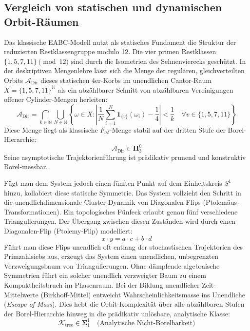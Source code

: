 \documentclass[11pt,a4paper]{article}
\numberwithin{equation}{section}
\begin{document}
	\subsection{Vergleich von statischen und dynamischen Orbit-Räumen}
	
	Das klassische EABC-Modell nutzt als statisches Fundament die Struktur der reduzierten Restklassengruppe modulo 12. Die vier primen Restklassen $\{1, 5, 7, 11\} \pmod{12}$ sind durch die Isometrien des Sehnenvierecks geschützt. In der deskriptiven Mengenlehre lässt sich die Menge der regulären, gleichverteilten Orbits $\mathcal{A}_{\text{Dir}}$ dieses statischen 4er-Korbs im unendlichen Cantor-Raum $X = \{1, 5, 7, 11\}^\mathbb{N}$ als ein abzählbarer Schnitt von abzählbaren Vereinigungen offener Cylinder-Mengen herleiten:
	\begin{equation}
		\mathcal{A}_{\text{Dir}} = \bigcap_{k \in \mathbb{N}} \bigcup_{N \in \mathbb{N}} \left\{ \omega \in X : \left| \frac{1}{N} \sum_{i=1}^N \mathbf{1}_{\{v\}}(\omega_i) - \frac{1}{4} \right| < \frac{1}{k} \quad \forall v \in \{1,5,7,11\} \right\}
	\end{equation}
	Diese Menge liegt als klassische $F_{\sigma\delta}$-Menge stabil auf der dritten Stufe der Borel-Hierarchie:
	\begin{equation}
		\mathcal{A}_{\text{Dir}} \in \mathbf{\Pi}^0_3
	\end{equation}
	Seine asymptotische Trajektorienführung ist prädikativ prunend und konstruktiv Borel-messbar.
	
	Fügt man dem System jedoch einen fünften Punkt auf dem Einheitskreis $S^1$ hinzu, kollabiert diese statische Symmetrie. Das System vollzieht den Schritt in die unendlichdimensionale Cluster-Dynamik von Diagonalen-Flips (Ptolemäus-Transformationen). Ein topologisches Fünfeck erlaubt genau fünf verschiedene Triangulierungen. Der Übergang zwischen diesen Zuständen wird durch einen Diagonalen-Flip (Ptolemy-Flip) modelliert:
	\begin{equation}
		x \cdot y = a \cdot c + b \cdot d
	\end{equation}
	Führt man diese Flips unendlich oft entlang der stochastischen Trajektorien des Primzahlsiebs aus, erzeugt das System einen unendlichen, unbegrenzten Verzweigungsbaum von Triangulierungen. Ohne dämpfende algebraische Symmetrien führt ein solcher unendlich verzweigter Baum zu einem Kompaktheitsbruch im Phasenraum. Bei der Bildung unendlicher Zeit-Mittelwerte (Birkhoff-Mittel) entweicht Wahrscheinlichkeitsmasse ins Unendliche (\textit{Escape of Mass}). Dies hebt die Orbit-Komplexität über alle abzählbaren Stufen der Borel-Hierarchie hinweg in die prädikativ unlösbare, analytische Klasse:
	\begin{equation}
		\mathcal{K}_{\text{tree}} \in \mathbf{\Sigma}^1_1 \quad \text{(Analytische Nicht-Borelbarkeit)}
	\end{equation}
	
\end{document}

